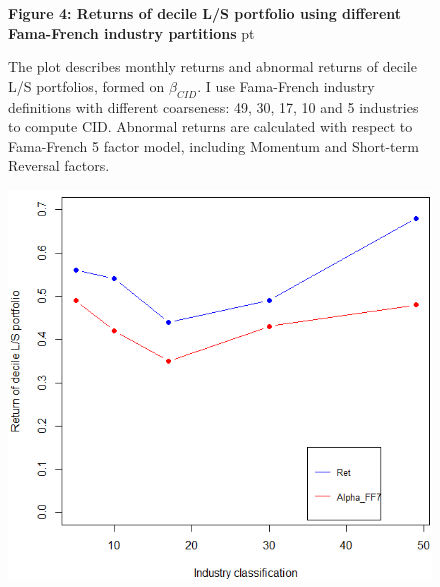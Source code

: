 \documentclass[12pt]{article}
\begin{document}
\begin{figure}
\textbf{Figure 4: Returns of decile L/S portfolio using different Fama-French industry partitions}
 pt
\begin{flushleft}
{The plot describes monthly returns and abnormal returns of decile L/S portfolios, formed on $\beta_{CID}$. I use Fama-French industry definitions with different coarseness: 49, 30, 17, 10 and 5 industries to compute CID. Abnormal returns are calculated with respect to Fama-French 5 factor model, including Momentum and Short-term Reversal factors.}
\end{flushleft}
\centering
\includegraphics[width=1\textwidth]{paper_b2/Figure4.png}
\end{figure}


\clearpage
\end{document}
